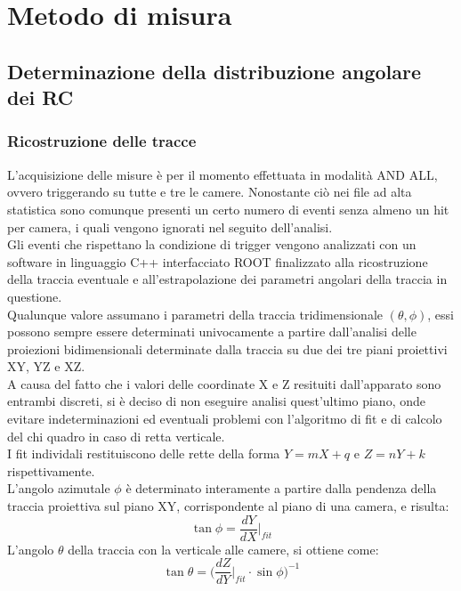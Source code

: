 \documentclass[8pt]{extarticle}
\begin{document}
\section{Metodo di misura}

\subsection{Determinazione della distribuzione angolare dei RC}

\subsubsection{Ricostruzione delle tracce} \label{subsub:algoritmo}
L’acquisizione delle misure è per il momento effettuata in modalità AND ALL, ovvero triggerando su tutte e tre le camere. Nonostante ciò nei file ad alta statistica sono comunque presenti un certo numero di eventi senza almeno un hit per camera, i quali vengono ignorati nel seguito dell’analisi.\\
Gli eventi che rispettano la condizione di trigger vengono analizzati con un software in linguaggio C++ interfacciato ROOT finalizzato alla ricostruzione della traccia eventuale e all’estrapolazione dei parametri angolari della traccia in questione.\\

Qualunque valore assumano i parametri della traccia tridimensionale $(\theta, \phi)$, essi possono sempre essere determinati univocamente a partire dall'analisi delle proiezioni bidimensionali determinate dalla traccia su due dei tre piani proiettivi XY, YZ e XZ. \\
A causa del fatto che i valori delle coordinate X e Z resituiti dall'apparato sono entrambi discreti, si è deciso di non eseguire analisi quest’ultimo piano, onde evitare indeterminazioni ed eventuali problemi con l'algoritmo di fit e di calcolo del chi quadro in caso di retta verticale.\\
I fit individali restituiscono delle rette della forma $Y=mX+q$ e $Z=nY+k$ rispettivamente.
\\
L'angolo azimutale $\phi$ è determinato interamente a partire dalla pendenza della traccia proiettiva sul piano XY, corrispondente al piano di una camera, e risulta:\[\tan{\phi}=\frac{dY}{dX}\biggr\rvert_{fit}\]
L'angolo $\theta$ della traccia con la verticale alle camere, si ottiene come:
\begin{equation}
\tan{\theta}=\Bigg(\frac{dZ}{dY}\biggr\rvert_{fit}\!\!\!\cdot \sin{\phi}\Bigg)^{-1}
\end{equation}
\end{document}
